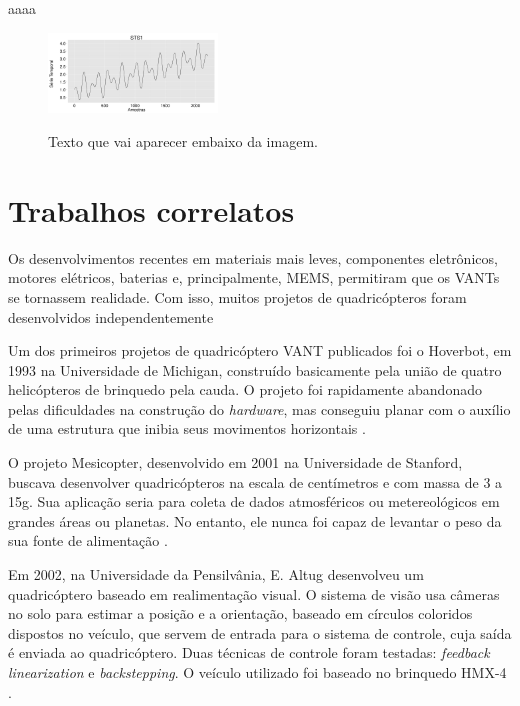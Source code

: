 %
aaaa

\begin{figure}[htb]
	\centering
	\includegraphics[width=0.4\textwidth]{Imagens/Arta1} %
	\caption[Texto que vai aparecer na lista de fig.]{Texto que vai aparecer embaixo da imagem.}
	\label{fig:tux_laplace}
\end{figure}

\section{Trabalhos correlatos}

Os desenvolvimentos recentes em materiais mais leves, componentes eletrônicos, motores elétricos, baterias e, principalmente, MEMS, permitiram que os VANTs se tornassem realidade. Com isso, muitos projetos de quadricópteros foram desenvolvidos independentemente 

Um dos primeiros projetos de quadricóptero VANT publicados foi o Hoverbot, em 1993 na Universidade de Michigan, construído basicamente pela união de quatro helicópteros de brinquedo pela cauda. O projeto foi rapidamente abandonado pelas dificuldades na construção do \textit{hardware}, mas conseguiu planar com o auxílio de uma estrutura que inibia seus movimentos horizontais \cite{borestein93}.

O projeto Mesicopter, desenvolvido em 2001 na Universidade de Stanford, buscava desenvolver quadricópteros na escala de centímetros e com massa de 3 a 15g. Sua aplicação seria para coleta de dados atmosféricos ou metereológicos em grandes áreas ou planetas. No entanto, ele nunca foi capaz de levantar o peso da sua fonte de alimentação \cite{kroo01}.

Em 2002, na Universidade da Pensilvânia, E. Altug desenvolveu um quadricóptero baseado em realimentação visual. O sistema de visão usa câmeras no solo para estimar a posição e a orientação, baseado em círculos coloridos dispostos no veículo, que servem de entrada para o sistema de controle, cuja saída é enviada ao quadricóptero. Duas técnicas de controle foram testadas: \textit{feedback linearization} e \textit{backstepping}. O veículo utilizado foi baseado no brinquedo HMX-4 \cite{altug02}.

